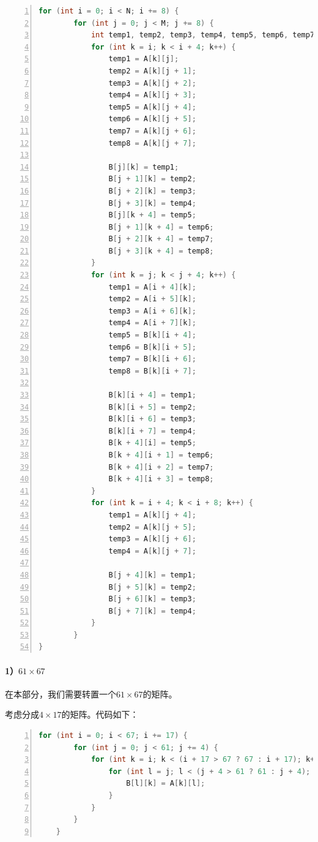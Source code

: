 \documentclass{article}
\begin{document}
\begin{lstlisting}[xleftmargin = 4em,xrightmargin = 4em, aboveskip = 1em, numbers = left, language = C]
    for (int i = 0; i < N; i += 8) {
        for (int j = 0; j < M; j += 8) {
            int temp1, temp2, temp3, temp4, temp5, temp6, temp7, temp8;
            for (int k = i; k < i + 4; k++) {
                temp1 = A[k][j];
                temp2 = A[k][j + 1];
                temp3 = A[k][j + 2];
                temp4 = A[k][j + 3];
                temp5 = A[k][j + 4];
                temp6 = A[k][j + 5];
                temp7 = A[k][j + 6];
                temp8 = A[k][j + 7];

                B[j][k] = temp1;
                B[j + 1][k] = temp2;
                B[j + 2][k] = temp3;
                B[j + 3][k] = temp4;
                B[j][k + 4] = temp5;
                B[j + 1][k + 4] = temp6;
                B[j + 2][k + 4] = temp7;
                B[j + 3][k + 4] = temp8;
            }
            for (int k = j; k < j + 4; k++) {
                temp1 = A[i + 4][k];
                temp2 = A[i + 5][k];
                temp3 = A[i + 6][k];
                temp4 = A[i + 7][k];
                temp5 = B[k][i + 4];
                temp6 = B[k][i + 5];
                temp7 = B[k][i + 6];
                temp8 = B[k][i + 7];

                B[k][i + 4] = temp1;
                B[k][i + 5] = temp2;
                B[k][i + 6] = temp3;
                B[k][i + 7] = temp4;
                B[k + 4][i] = temp5;
                B[k + 4][i + 1] = temp6;
                B[k + 4][i + 2] = temp7;
                B[k + 4][i + 3] = temp8;
            }
            for (int k = i + 4; k < i + 8; k++) {
                temp1 = A[k][j + 4];
                temp2 = A[k][j + 5];
                temp3 = A[k][j + 6];
                temp4 = A[k][j + 7];

                B[j + 4][k] = temp1;
                B[j + 5][k] = temp2;
                B[j + 6][k] = temp3;
                B[j + 7][k] = temp4;
            }
        }
}
\end{lstlisting}

\paragraph*{1）$61 \times 67$}
在本部分，我们需要转置一个$61 \times 67$的矩阵。

考虑分成$4\times 17$的矩阵。代码如下：

\begin{lstlisting}[xleftmargin = 4em,xrightmargin = 4em, aboveskip = 1em, numbers = left, language = C]
    for (int i = 0; i < 67; i += 17) {
        for (int j = 0; j < 61; j += 4) {
            for (int k = i; k < (i + 17 > 67 ? 67 : i + 17); k++) {
                for (int l = j; l < (j + 4 > 61 ? 61 : j + 4); l++) {
                    B[l][k] = A[k][l];
                }
            }
        }
    }
\end{lstlisting}
\end{document}

